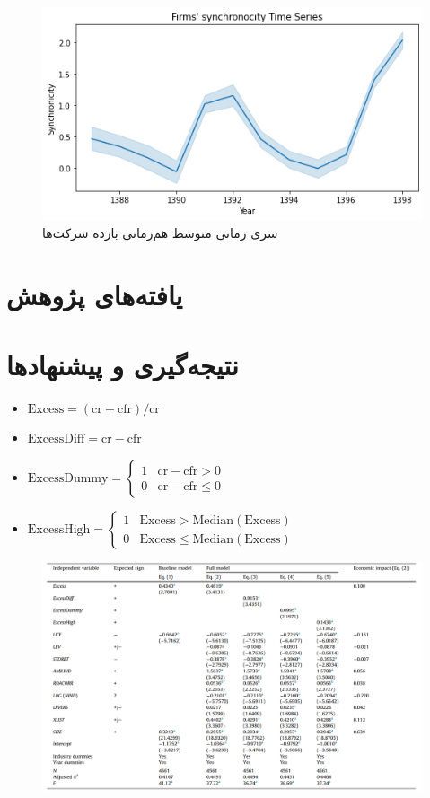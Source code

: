 \documentclass[12pt, a4paper]{article}
\begin{document}
  \begin{figure}[htbp]
  	\centering
  	\includegraphics[width=0.85\linewidth]{SYNCHtimeSeries}
  	\caption{سری زمانی متوسط هم‌زمانی بازده شرکت‌ها }
  	\label{fig:synchtimeseries}
  \end{figure}
  
\section{یافته‌های پژوهش}
\section{نتیجه‌گیری و پیشنهاد‌ها}


	\begin{itemize}
		\item $ \text{Excess} = (\text{cr} - \text{cfr})/\text{cr} $
		\item $ \text{ExcessDiff} = \text{cr} - \text{cfr} $
		\item $ \text{ExcessDummy} = \left\{\begin{array}{ll}
			1 & \text{cr} - \text{cfr}>0\\
			0 & \text{cr} - \text{cfr}\leq 0
		\end{array}\right.  $
	\item $ \text{ExcessHigh} = \left\{\begin{array}{ll}
		1 & \text{Excess}>\text{Median}(\text{Excess})\\
		0 & \text{Excess}\leq \text{Median}(\text{Excess})
	\end{array}\right.  $
	\end{itemize}

\begin{figure}
	\centering
	\includegraphics[width=0.9\linewidth]{t4}
	\label{fig:t4}
\end{figure}
\end{document}
